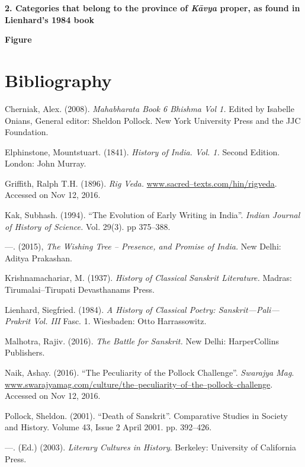 \textbf{2. Categories that belong to the province of \textit{Kāvya} proper, as found in Lienhard’s 1984 book}

\textbf{Figure}


\section*{Bibliography}

\begin{thebibliography}{99}
 Cherniak, Alex. (2008). \textit{Mahabharata Book 6 Bhishma Vol 1.} Edited by Isabelle Onians, General editor: Sheldon Pollock. New York University Press and the JJC Foundation.

  Elphinstone, Mountstuart. (1841). \textit{History of India. Vol. 1.} Second Edition. London: John Murray.

  Griffith, Ralph T.H. (1896). \textit{Rig Veda.} \url{www.sacred–texts.com/hin/rigveda}. Accessed on Nov 12, 2016.

  Kak, Subhash. (1994). “The Evolution of Early Writing in India”. \textit{Indian Journal of History of Science.} Vol. 29(3). pp 375–388.

  —. (2015), \textit{The Wishing Tree – Presence, and Promise of India.} New Delhi: Aditya Prakashan.

  Krishnamachariar, M. (1937). \textit{History of Classical Sanskrit Literature.} Madras: Tirumalai–Tirupati Devasthanams Press.

  Lienhard, Siegfried. (1984). \textit{A History of Classical Poetry: Sanskrit—Pali—Prakrit Vol. III} Fasc. 1. Wiesbaden: Otto Harrassowitz.

  Malhotra, Rajiv. (2016). \textit{The Battle for Sanskrit.} New Delhi: HarperCollins Publishers.

  Naik, Ashay. (2016). “The Peculiarity of the Pollock Challenge”. \textit{Swarajya Mag}. \url{www.swarajyamag.com/culture/the–peculiarity–of–the–pollock–challenge}. Accessed on Nov 12, 2016.

  Pollock, Sheldon. (2001). “Death of Sanskrit”. Comparative Studies in Society and History. Volume 43, Issue 2 April 2001. pp. 392–426. 

  —. (Ed.) (2003). \textit{Literary Cultures in History}. Berkeley: University of California Press.


\end{thebibliography}
